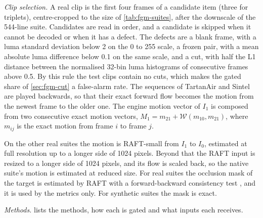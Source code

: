 \emph{Clip selection.} A real clip is the first four frames of a candidate item (three for triplets), centre-cropped to the size of \cref{tab:fgm-suites}, after the downscale of the 544-line suite. Candidates are read in order, and a candidate is skipped when it cannot be decoded or when it has a defect. The defects are a blank frame, with a luma standard deviation below 2 on the 0 to 255 scale, a frozen pair, with a mean absolute luma difference below 0.1 on the same scale, and a cut, with half the L1 distance between the normalised 32-bin luma histograms of consecutive frames above 0.5. By this rule the test clips contain no cuts, which makes the gated share of \cref{sec:fgm-cut} a false-alarm rate. The sequences of TartanAir and Sintel are played backwards, so that their exact forward flow becomes the motion from the newest frame to the older one. The engine motion vector of $I_1$ is composed from two consecutive exact motion vectors, $M_1=m_{21}+\mathcal W(m_{10},m_{21})$, where $m_{ij}$ is the exact motion from frame $i$ to frame $j$.

On the other real suites the motion is RAFT-small from $I_1$ to $I_0$, estimated at full resolution up to a longer side of 1024 pixels. Beyond that the RAFT input is resized to a longer side of 1024 pixels, and its flow is scaled back, so the native suite's motion is estimated at reduced size. For real suites the occlusion mask of the target is estimated by RAFT with a forward-backward consistency test \cite{meister2018unflow}, and it is used by the metrics only. For synthetic suites the mask is exact.

\emph{Methods.}  lists the methods, how each is gated and what inputs each receives.

